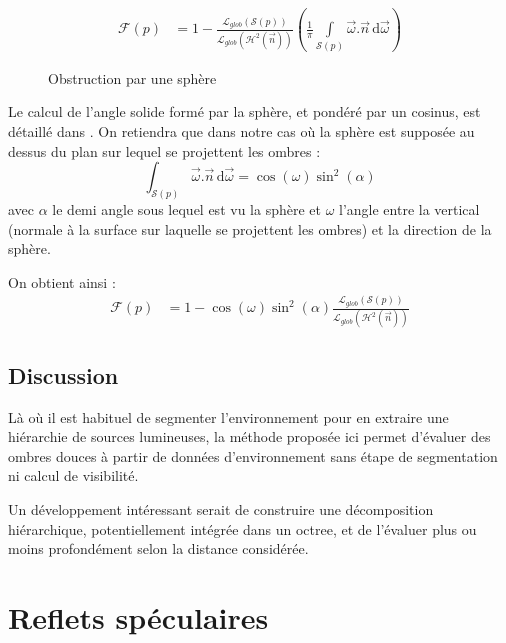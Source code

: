 \documentclass[10pt,a4paper,twoside, twocolumn]{report}
\newcommand*{\rootPath}{../}
\begin{document}
\begin{align}
	\mathcal F(p)	&=	1 - \frac{\mathcal L_{glob}(\mathcal{S}(p))}{\mathcal L_{glob}(\mathcal{H}^2(\vec{n}))}\left(\frac{1}{\pi}\int\limits_{\mathcal{S}(p)}\vec\omega.\vec n\, \mathrm d\vec\omega\right)
\end{align}

\begin{figure}[!ht]
	\centering
	
	\caption{Obstruction par une sphère}
	\label{fig:tikz:obstruction}
\end{figure}

Le calcul de l’angle solide formé par la sphère, et pondéré par un cosinus, est détaillé dans \cite{Snyder1996}. On retiendra que dans notre cas où la sphère est supposée au dessus du plan sur lequel se projettent les ombres :
\begin{equation}
	\int_{\mathcal{S}(p)}\vec\omega.\vec n\, \mathrm d\vec\omega = \cos(\omega)\sin^2(\alpha)
\end{equation}
avec $\alpha$ le demi angle sous lequel est vu la sphère et $\omega$ l’angle entre la vertical (normale à la surface sur laquelle se projettent les ombres) et la direction de la sphère.

On obtient ainsi :
\begin{align}
	\mathcal F(p)	&=	1 - \cos(\omega)\sin^2(\alpha)\frac{\mathcal L_{glob}(\mathcal{S}(p))}{\mathcal L_{glob}(\mathcal{H}^2(\vec{n}))}
\end{align}


\subsection{Discussion}

Là où il est habituel de segmenter l’environnement pour en extraire une hiérarchie de sources lumineuses, la méthode proposée ici permet d’évaluer des ombres douces à partir de données d’environnement sans étape de segmentation ni calcul de visibilité. 

Un développement intéressant serait de construire une décomposition hiérarchique, potentiellement intégrée dans un octree, et de l’évaluer plus ou moins profondément selon la distance considérée.



\section{Reflets spéculaires}
\end{document}
